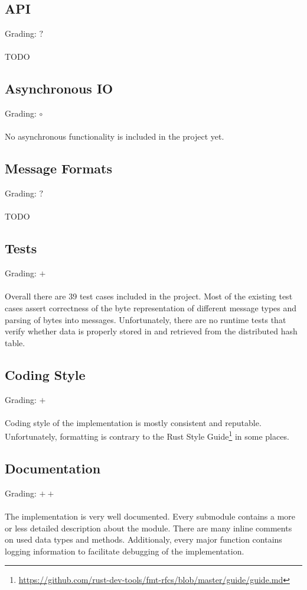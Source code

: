 \documentclass[a4paper, 11pt]{article}
\begin{document}
\subsection*{API}
Grading: $?$\\
\\
TODO


\subsection*{Asynchronous IO}
Grading: $\circ$\\
\\
No asynchronous functionality is included in the project yet.


\subsection*{Message Formats}
Grading: $?$\\
\\
TODO


\subsection*{Tests}
Grading: $+$\\
\\
Overall there are 39 test cases included in the project.
Most of the existing test cases assert correctness of the byte representation of different message types and parsing of bytes into messages.
Unfortunately, there are no runtime tests that verify whether data is properly stored in and retrieved from the distributed hash table.


\subsection*{Coding Style}
Grading: $+$\\
\\
Coding style of the implementation is mostly consistent and reputable.
Unfortunately, formatting is contrary to the Rust Style Guide\footnote{\url{https://github.com/rust-dev-tools/fmt-rfcs/blob/master/guide/guide.md}} in some places.


\subsection*{Documentation}
Grading: $++$\\
\\
The implementation is very well documented.
Every submodule contains a more or less detailed description about the module.
There are many inline comments on used data types and methods.
Additionaly, every major function contains logging information to facilitate debugging of the implementation.
\end{document}

